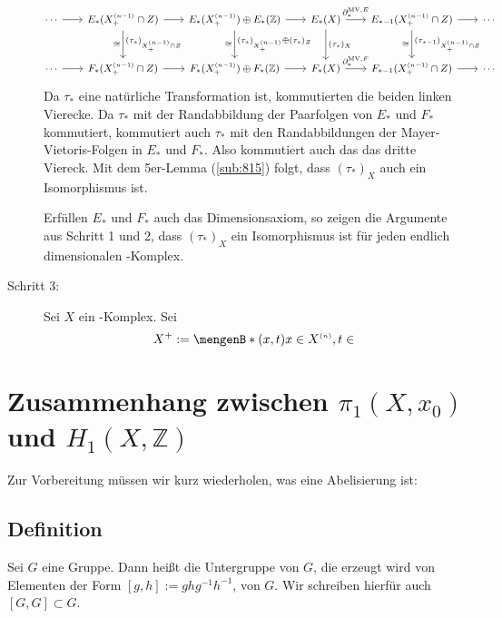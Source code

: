 \begin{description}
	\[
		\!\!\begin{tikzcd}[column sep=1.8em, row sep=2.5em,font=\small]
			\cdots \rar & E_* \enbrace{X_+^\ssbrace{n-1} \cap Z} \rar \dar["(\tau_*)_{X_+^\ssbrace{n-1} \cap Z}","\cong"']
			& E_*\enbrace{X_+^\ssbrace{n-1}} \oplus E_*(\mathds{Z}) \rar \dar["(\tau_*)_{X_+^\ssbrace{n-1}} \oplus (\tau_*)_{Z}","\cong"']
			& E_*(X) \rar["\partial_*^{\mathrm{MV},E}"] \dar["(\tau_*)_X"]
			& E_{*-1} \enbrace{X_+^\ssbrace{n-1} \cap Z} \rar \dar["(\tau_{*-1})_{X_+^\ssbrace{n-1} \cap Z}", "\cong"'] & \cdots  \\
			\cdots \rar & F_* \enbrace{X_+^\ssbrace{n-1} \cap Z} \rar & F_*\enbrace{X_+^\ssbrace{n-1}} \oplus F_*(\mathds{Z}) \rar 
			& F_*(X) \rar["\partial_*^{\mathrm{MV},F}"] & F_{*-1} \enbrace{X_+^\ssbrace{n-1} \cap Z} \rar & \cdots
		\end{tikzcd}
	\]
	Da $\tau_*$ eine natürliche Transformation ist, kommutierten die beiden linken Vierecke. Da $\tau_*$ mit der Randabbildung der Paarfolgen von $E_*$ und $F_*$ 
	kommutiert, kommutiert auch $\tau_*$ mit den Randabbildungen der Mayer-Vietoris-Folgen in $E_*$ und $F_*$. Also kommutiert auch das das dritte Viereck. Mit dem 
	5er-Lemma (\ref*{sub:815}) folgt, dass $(\tau_*)_X$ auch ein Isomorphismus ist.
	
	Erfüllen $E_*$ und $F_*$ auch das Dimensionsaxiom, so zeigen die Argumente aus Schritt 1 und 2, dass $(\tau_*)_X$ ein Isomorphismus ist für jeden endlich dimensionalen
	\CW-Komplex.
	\item[Schritt 3:] Sei $X$ ein \CW-Komplex. Sei 
	\[
		X^+ := \set[(x,t)]{x \in X^\ssbrace{n}, t \in } 
	\]
\end{description}
\newpage
\section{Zusammenhang zwischen $\pi_1(X,x_0)$ und $H_1(X,\mathds{Z})$} %
\label{sec:15}

Zur Vorbereitung müssen wir kurz wiederholen, was eine Abelisierung ist:

\subsection[Definition: Kommutatorgruppe]{Definition} %
\label{sub:151}
Sei $G$ eine Gruppe. Dann heißt die Untergruppe von $G$, die erzeugt wird von Elementen der Form $[g,h]:= g h g^{-1} h ^{-1}$,  von $G$. Wir schreiben
hierfür auch $[G,G] \subset G$.

